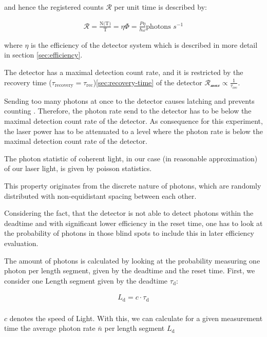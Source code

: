 and hence the registered counts $\mathcal{R}$ per unit time is described by:

\begin{align}
    \mathcal{R} = \frac{\text{N(T)}}{\text{T}} = \eta \Phi= \frac{P \eta}{\hbar \omega} \text{photons  $s^{-1}$}
\end{align}

where \textit{$\eta$} is the efficiency of the detector system which is described in more detail in section \ref{sec:efficiency}.

The detector has a maximal detection count rate, and it is restricted by the recovery time ($\tau_{\text{recovery}} = \tau_{\text{rec}}$)\ref{sec:recovery-time} of the detector
$\mathcal{R_{\max}} \propto \frac{1}{\tau_{\text{rec}}}$.

Sending too many photons at once to the detector causes latching and prevents counting \cite{single-quantum-2022}.
Therefore, the photon rate send to the detector has to be below the maximal detection count rate of the detector.
As consequence for this experiment, the laser power has to be attenuated to a level where the photon rate is below the
maximal detection count rate of the detector.

The photon statistic of coherent light, in our case (in reasonable approximation) of our laser light,
is given by poisson statistics.

This property originates from the discrete nature of photons, which are randomly distributed with non-equidistant
spacing between each other.

Considering the fact, that the detector is not able to detect photons within the deadtime and with significant lower efficiency
in the reset time, one has to look at the probability of photons in those blind spots to include this in later efficiency evaluation.

The amount of photons is calculated by looking at the probability measuring one photon per length segment, given by
the deadtime and the reset time.
First, we consider one Length segment given by the deadtime $\tau_{\text{d}}$:

\begin{align}
    L_{\text{d}} = c \cdot \tau_{\text{d}} \\
\end{align}

$c$ denotes the speed of Light.
With this, we can calculate for a given measurement time the average photon rate $\bar{n}$ per length segment $L_{\text{d}}$

